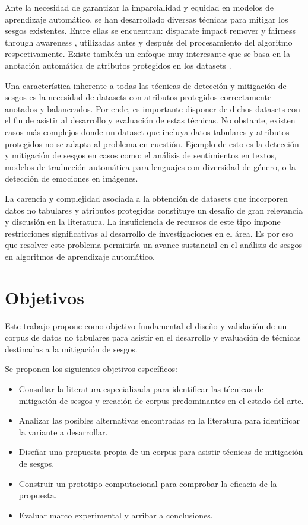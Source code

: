 Ante la necesidad de garantizar la imparcialidad y equidad en modelos de aprendizaje autom\'atico, se han desarrollado diversas t\'ecnicas para 
mitigar los sesgos existentes. Entre ellas se encuentran: disparate impact remover \parencite{dis_impact_rem} y fairness through awareness 
\parencite{fair_awareness}, utilizadas antes y despu\'es del procesamiento del algoritmo respectivamente. Existe tambi\'en un enfoque muy 
interesante que se basa en la anotaci\'on autom\'atica de atributos protegidos en los datasets 
\parencite{soumah2023radar,dinan2020multidimensional,10.1007/978-3-031-35320-8_39}.

Una caracter\'istica inherente a todas las t\'ecnicas de detecci\'on y mitigaci\'on de sesgos es la necesidad de datasets con atributos protegidos 
correctamente anotados y balanceados. Por ende, es importante disponer de dichos datasets con el fin de asistir al desarrollo y evaluaci\'on 
de estas t\'ecnicas. No obstante, existen casos m\'as complejos donde un dataset que incluya datos tabulares y atributos protegidos no se adapta 
al problema en cuesti\'on. Ejemplo de esto es la detecci\'on y mitigaci\'on de sesgos en casos como: el an\'alisis de sentimientos en textos, 
modelos de traducci\'on autom\'atica para lenguajes con diversidad de g\'enero, o la detecci\'on de emociones en im\'agenes. 

La carencia y complejidad asociada a la obtenci\'on de datasets que incorporen datos no tabulares y atributos protegidos constituye un desaf\'io 
de gran relevancia y discusi\'on en la literatura. La insuficiencia de recursos de este tipo impone restricciones significativas al desarrollo 
de investigaciones en el \'area. Es por eso que resolver este problema permitir\'ia un avance sustancial en el an\'alisis de sesgos en algoritmos
de aprendizaje autom\'atico. 

\section*{Objetivos}
Este trabajo propone como objetivo fundamental el dise\~no y validaci\'on de un corpus de datos no tabulares para
asistir en el desarrollo y evaluaci\'on de t\'ecnicas destinadas a la mitigaci\'on de sesgos.

Se proponen los siguientes objetivos espec\'ificos:
\begin{itemize}
    \item Consultar la literatura especializada para identificar las t\'ecnicas de mitigaci\'on de sesgos y creaci\'on
    de corpus predominantes en el estado del arte.
    \item Analizar las posibles alternativas encontradas en la literatura para identificar la variante a desarrollar.
    \item Dise\~nar una propuesta propia de un corpus para asistir t\'ecnicas de mitigaci\'on de sesgos. 
    \item Construir un prototipo computacional para comprobar la eficacia de la propuesta.
    \item Evaluar marco experimental y arribar a conclusiones.
\end{itemize}

